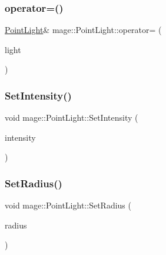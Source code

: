 \hypertarget{classmage_1_1_point_light_a223e5a389749f63206c57c5cf7107816}{}\label{classmage_1_1_point_light_a223e5a389749f63206c57c5cf7107816} 
\subsubsection{\texorpdfstring{operator=()}{operator=()}\hspace{0.1cm}{\footnotesize\ttfamily [2/2]}}
{\footnotesize\ttfamily \hyperlink{classmage_1_1_point_light}{Point\+Light}\& mage\+::\+Point\+Light\+::operator= (\begin{DoxyParamCaption}\item[{\hyperlink{classmage_1_1_point_light}{Point\+Light} \&\&}]{light }\end{DoxyParamCaption})}

\hypertarget{classmage_1_1_point_light_a40c0790159f687fd653a4792f8b39a21}{}\label{classmage_1_1_point_light_a40c0790159f687fd653a4792f8b39a21} 
\subsubsection{\texorpdfstring{Set\+Intensity()}{SetIntensity()}}
{\footnotesize\ttfamily void mage\+::\+Point\+Light\+::\+Set\+Intensity (\begin{DoxyParamCaption}\item[{const \hyperlink{structmage_1_1_r_g_b_spectrum}{R\+G\+B\+Spectrum} \&}]{intensity }\end{DoxyParamCaption})}

\hypertarget{classmage_1_1_point_light_ae7b4c301c148bd78348e26e5b6ad8faf}{}\label{classmage_1_1_point_light_ae7b4c301c148bd78348e26e5b6ad8faf} 
\subsubsection{\texorpdfstring{Set\+Radius()}{SetRadius()}}
{\footnotesize\ttfamily void mage\+::\+Point\+Light\+::\+Set\+Radius (\begin{DoxyParamCaption}\item[{float}]{radius }\end{DoxyParamCaption})}



